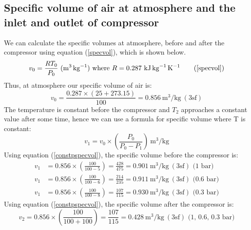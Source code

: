 \documentclass[class=article, crop=false, 12pt,a4paper]{standalone}
\numberwithin{equation}{section}
\begin{document}
\subsection{Specific volume of air at atmosphere and the inlet and outlet of compressor}
We can calculate the specific volumes at atmosphere, before and after the compressor using equation (\ref{specvol}), which is shown below.
\begin{equation}
  v_0 = \frac{RT_0}{P_0} \ (\si{\meter\cubed\per\kg}) \textrm{ where \(R = 0.287 \ \si{\kilo\joule\per\kg\per\kelvin}\)}
  \tag{\ref{specvol}}
\end{equation}
Thus, at atmosphere our specific volume of air is:
\begin{equation} 
  v_0 = \frac{0.287 \times (25+273.15)}{100} = 0.856 \ \si{\meter\cubed\per\kg} \ (3\textrm{sf}) 
\end{equation}
The temperature is constant before the compressor and \(T_2\) approaches a constant value after some time, hence we can use a formula for specific volume where T is constant:
\begin{equation}
  v_1 = v_0 \times \left( \frac{P_0}{P_0 - P_1} \right) \ \si{\meter\cubed\per\kg}
  \label{constpspecvol}
\end{equation}
Using equation (\ref{constpspecvol}), the specific volume before the compressor is:
\begin{align} 
  v_1 &= 0.856 \times \left( \frac{100}{100-5} \right) = \frac{428}{475} = 0.901 \ \si{\meter\cubed\per\kg} \ (3\textrm{sf}) \textrm{ (1 bar)} \\
  v_1 &= 0.856 \times \left( \frac{100}{100-6} \right) = \frac{214}{235} = 0.911 \ \si{\meter\cubed\per\kg} \ (3\textrm{sf}) \textrm{ (0.6 bar)} \\
  v_1 &= 0.856 \times \left( \frac{100}{100-8} \right) = \frac{107}{115} = 0.930 \ \si{\meter\cubed\per\kg} \ (3\textrm{sf}) \textrm{ (0.3 bar)} 
\end{align}
Using equation (\ref{constpspecvol}), the specific volume after the compressor is:
\begin{equation} v_2 = 0.856 \times \left( \frac{100}{100+100} \right) = \frac{107}{115} = 0.428 \ \si{\meter\cubed\per\kg} \ (3\textrm{sf}) \textrm{ (1, 0.6, 0.3 bar)} \end{equation}
\end{document}
